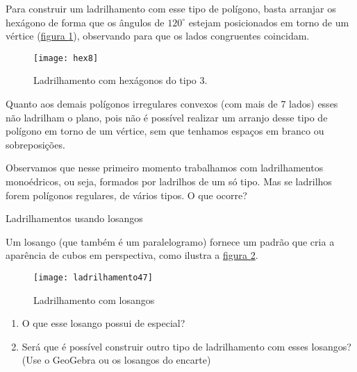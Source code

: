 Para construir um ladrilhamento com esse tipo de polígono, basta arranjar os hexágono de forma que os ângulos de $120^{\circ}$ estejam posicionados em torno de um vértice (\hyperref[hex8]{figura \ref{hex8}}), observando para que os lados congruentes coincidam.

\begin{figure}[H]
\centering
\texttt{[image: hex8]}
\caption{Ladrilhamento com hexágonos do tipo 3.}
\label{hex8}
\end{figure}


Quanto aos demais polígonos irregulares convexos (com mais de 7 lados) esses não ladrilham o plano, pois não é possível realizar um arranjo desse tipo de polígono em torno de um vértice, sem que tenhamos espaços em branco ou sobreposições.

Observamos que nesse primeiro momento trabalhamos com ladrilhamentos monoédricos, ou seja, formados por ladrilhos de um só tipo. Mas se  ladrilhos forem polígonos regulares, de vários tipos. O que ocorre?





\begin{task}{Ladrilhamentos usando losangos}

Um losango (que também é um paralelogramo) fornece um padrão que cria a aparência de cubos em perspectiva, como ilustra a \hyperref[losango]{figura \ref{losango}}.

	\begin{figure}[H]
	\centering
	\texttt{[image: ladrilhamento47]}
    \caption{Ladrilhamento com losangos}
   	\label{losango}
	\end{figure}
	
\begin{enumerate}
			\item O que esse losango possui de especial?
			\item Será que é possível construir outro tipo de ladrilhamento com esses losangos? (Use o GeoGebra ou os losangos do encarte)
\end{enumerate}
\end{task}

